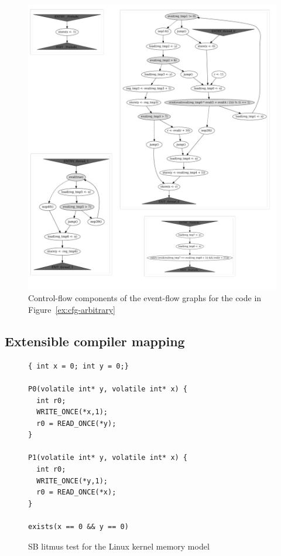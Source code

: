 \begin{figure}[!h]
\includegraphics[width=\textwidth,keepaspectratio]{img/my/graphs/cfg-arbitrary/collage.jpg}
\caption{Control-flow components of the event-flow graphs for the code in Figure~\ref{ex:cfg-arbitrary}}
\label{ex:cfg-arbitrary:pic}
\end{figure}


\subsection{Extensible compiler mapping}

\begin{figure}%
\centering
\begin{minipage}[t]{.49\textwidth}%
\begin{lstlisting}
{ int x = 0; int y = 0;}

P0(volatile int* y, volatile int* x) {
  int r0;
  WRITE_ONCE(*x,1);
  r0 = READ_ONCE(*y);
}

P1(volatile int* y, volatile int* x) {
  int r0;
  WRITE_ONCE(*y,1);
  r0 = READ_ONCE(*x);
}

exists(x == 0 && y == 0)
\end{lstlisting}
\end{minipage}
\caption{SB litmus test for the Linux kernel memory model}
\label{ex:sb:kernel}
\end{figure}

